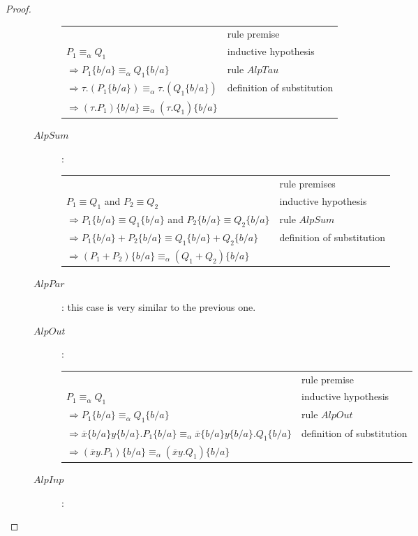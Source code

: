 \begin{lemma}
\begin{proof}
\begin{description}
\begin{description}
\begin{center}
\begin{tabular}{ll}
		&rule premise\\
		$P_{1}\equiv_{\alpha}Q_{1}$&inductive hypothesis\\
		$\Rightarrow P_{1}\{b/a\}\equiv_{\alpha}Q_{1}\{b/a\}$&rule $AlpTau$\\
		$\Rightarrow \tau.(P_{1}\{b/a\})\equiv_{\alpha}\tau.(Q_{1}\{b/a\}) $&definition of substitution\\
		$\Rightarrow (\tau.P_{1})\{b/a\}\equiv_{\alpha}(\tau.Q_{1})\{b/a\} $&\\
	      \end{tabular}
	    \end{center}
	  \item[$AlpSum$]:
	    \begin{center}
	      \begin{tabular}{ll}
		&rule premises\\
		$P_{1}\equiv Q_{1}$ and $P_{2}\equiv Q_{2}$&inductive hypothesis\\
		$\Rightarrow P_{1}\{b/a\}\equiv Q_{1}\{b/a\}$ and $P_{2}\{b/a\}\equiv Q_{2}\{b/a\}$&rule $AlpSum$\\
		$\Rightarrow P_{1}\{b/a\}+P_{2}\{b/a\}\equiv Q_{1}\{b/a\}+Q_{2}\{b/a\} $&definition of substitution\\
		$\Rightarrow (P_{1}+P_{2})\{b/a\}\equiv_{\alpha}(Q_{1}+Q_{2})\{b/a\} $&\\
	      \end{tabular}
	    \end{center}
	  \item[$AlpPar$]:
	    this case is very similar to the previous one.
	  \item[$AlpOut$]:
	    \begin{center}
	      \begin{tabular}{ll}
		&rule premise\\
		$P_{1}\equiv_{\alpha}Q_{1}$&inductive hypothesis\\
		$\Rightarrow P_{1}\{b/a\}\equiv_{\alpha}Q_{1}\{b/a\}$&rule $AlpOut$\\
		$\Rightarrow \overline{x}\{b/a\}y\{b/a\}.P_{1}\{b/a\}\equiv_{\alpha}\overline{x}\{b/a\}y\{b/a\}.Q_{1}\{b/a\} $&definition of substitution\\
		$\Rightarrow (\overline{x}y.P_{1})\{b/a\}\equiv_{\alpha}(\overline{x}y.Q_{1})\{b/a\} $&\\
	      \end{tabular}
	    \end{center}
	  \item[$AlpInp$]:
	    \begin{center}

\end{center}
\end{description}
\end{description}
\end{proof}
\end{lemma}
